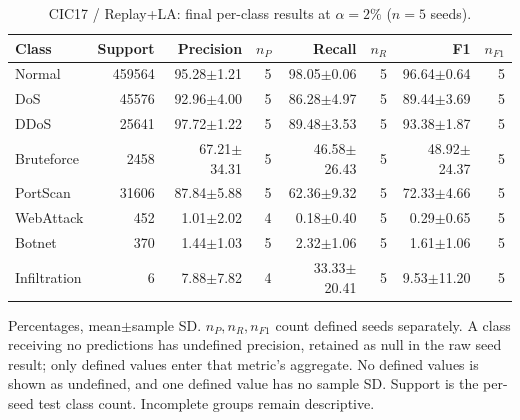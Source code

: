 \begin{table}[t]
\centering\scriptsize
\setlength{\tabcolsep}{3.3pt}
\caption{CIC17 / Replay+LA: final per-class results at $\alpha=2\%$ ($n=5$ seeds).}\label{tab:forgetting-class-cic_ids_2017-replay-la}
\begin{tabular}{lrrrrrrr}
\toprule
Class & Support & Precision & $n_P$ & Recall & $n_R$ & F1 & $n_{F1}$ \\
\midrule
Normal & 459564 & 95.28$\pm$1.21 & 5 & 98.05$\pm$0.06 & 5 & 96.64$\pm$0.64 & 5 \\
DoS & 45576 & 92.96$\pm$4.00 & 5 & 86.28$\pm$4.97 & 5 & 89.44$\pm$3.69 & 5 \\
DDoS & 25641 & 97.72$\pm$1.22 & 5 & 89.48$\pm$3.53 & 5 & 93.38$\pm$1.87 & 5 \\
Bruteforce & 2458 & 67.21$\pm$34.31 & 5 & 46.58$\pm$26.43 & 5 & 48.92$\pm$24.37 & 5 \\
PortScan & 31606 & 87.84$\pm$5.88 & 5 & 62.36$\pm$9.32 & 5 & 72.33$\pm$4.66 & 5 \\
WebAttack & 452 & 1.01$\pm$2.02 & 4 & 0.18$\pm$0.40 & 5 & 0.29$\pm$0.65 & 5 \\
Botnet & 370 & 1.44$\pm$1.03 & 5 & 2.32$\pm$1.06 & 5 & 1.61$\pm$1.06 & 5 \\
Infiltration & 6 & 7.88$\pm$7.82 & 4 & 33.33$\pm$20.41 & 5 & 9.53$\pm$11.20 & 5 \\
\bottomrule
\end{tabular}
\par\smallskip\begin{minipage}{0.98\textwidth}\scriptsize Percentages, mean$\pm$sample SD. $n_P,n_R,n_{F1}$ count defined seeds separately. A class receiving no predictions has undefined precision, retained as null in the raw seed result; only defined values enter that metric's aggregate. No defined values is shown as undefined, and one defined value has no sample SD. Support is the per-seed test class count. Incomplete groups remain descriptive.\end{minipage}
\end{table}

